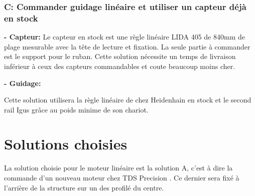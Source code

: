 \subsubsection{C: Commander guidage linéaire et utiliser un capteur déjà en stock}
\textbf{ - Capteur:}
\newline
Le capteur en stock est une règle linéaire LIDA 405 de 840mm de plage mesurable avec la tête de lecture et fixation. La seule partie à commander
est le support pour le ruban. Cette solution nécessite un temps de livraison inférieur à ceux des capteurs commandables et coute beaucoup moins cher.

\textbf{ - Guidage:}
\newline

\begin{table}[H]
  \centering
  \caption{Offres pour le guidage}
  \label{tab:OffreGuid2}
\end{table}

Cette solution utilisera la règle linéaire de chez Heidenhain en stock et le second rail Igus grâce au poids minime de son chariot.

\section{Solutions choisies}\label{sec:SolChoix}

La solution choisie pour le moteur linéaire est la solution A, c'est à dire la commande d'un nouveau moteur chez TDS Precision \cite{TDSPrecisionProducts}. Ce dernier
sera fixé à l'arrière de la structure sur un des profilé du centre.\\

